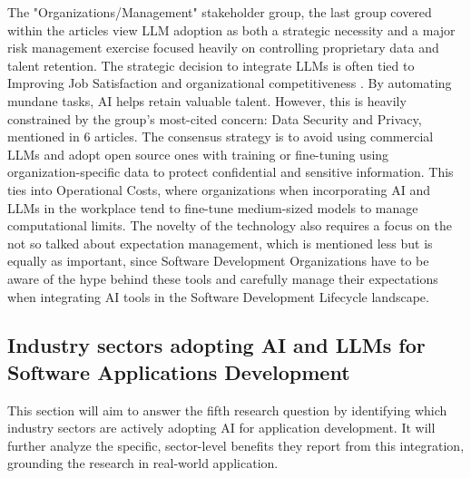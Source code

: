 The "Organizations/Management" stakeholder group, the last group covered within the articles view LLM adoption as both a strategic necessity and a major risk management exercise focused heavily on controlling proprietary data and talent retention. The strategic decision to integrate LLMs is often tied to Improving Job Satisfaction and organizational competitiveness \cite{Jensen:2025me}. By automating mundane tasks, AI helps retain valuable talent. However, this is heavily constrained by the group's most-cited concern: Data Security and Privacy, mentioned in 6 articles. The consensus strategy is to avoid using commercial LLMs and adopt open source ones with training or fine-tuning using organization-specific data to protect confidential and sensitive information. This ties into Operational Costs, where organizations when incorporating AI and LLMs in the workplace tend to fine-tune medium-sized models to manage computational limits. The novelty of the technology also requires a focus on the not so talked about expectation management, which is mentioned less but is equally as important, since Software Development Organizations have to be aware of the hype behind these tools and carefully manage their expectations when integrating AI tools in the Software Development Lifecycle landscape.

\subsection{Industry sectors adopting AI and LLMs for Software Applications Development}

This section will aim to answer the fifth research question by identifying which industry sectors are actively adopting AI for application development. It will further analyze the specific, sector-level benefits they report from this integration, grounding the research in real-world application.



